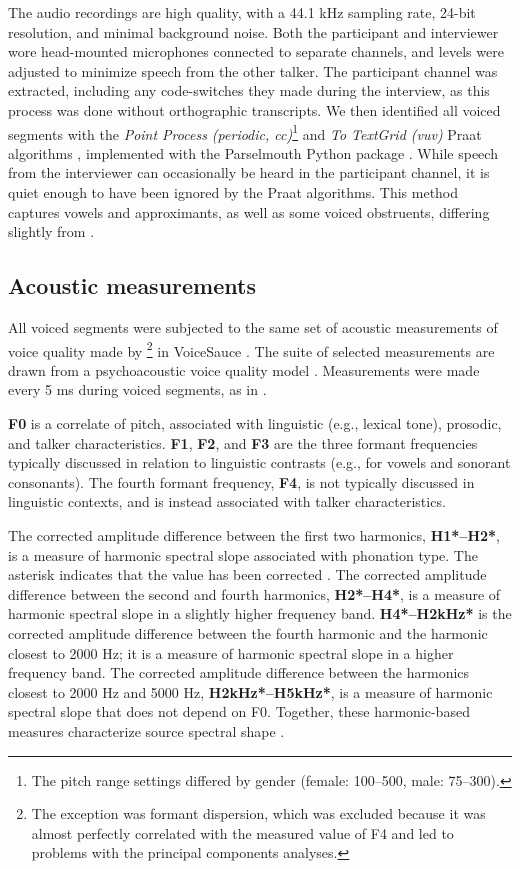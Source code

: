 The audio recordings are high quality, with a 44.1 kHz sampling rate, 24-bit resolution, and minimal background noise. Both the participant and interviewer wore head-mounted microphones connected to separate channels, and levels were adjusted to minimize speech from the other talker. The participant channel was extracted, including any code-switches they made during the interview, as this process was done without orthographic transcripts. We then identified all voiced segments with the \textit{Point Process (periodic, cc)}\footnote{The pitch range settings differed by gender (female: 100--500, male: 75--300).} and \textit{To TextGrid (vuv)} Praat algorithms \citep{boersma_2021_praat}, implemented with the Parselmouth Python package \citep{jadoul_2018_parselmouth}. While speech from the interviewer can occasionally be heard in the participant channel, it is quiet enough to have been ignored by the Praat algorithms. This method captures vowels and approximants, as well as some voiced obstruents, differing slightly from \citep{lee_2019_acoustic-paper}. 

\subsection{Acoustic measurements}\label{ch3:sec:acoustic}
All voiced segments were subjected to the same set of acoustic measurements of voice quality made by \citet{lee_2019_acoustic-paper}\footnote{The exception was formant dispersion, which was excluded because it was almost perfectly correlated with the measured value of F4 and led to problems with the principal components analyses.} in VoiceSauce \citep{shue_2011_voicesauce}. The suite of selected measurements are drawn from a psychoacoustic voice quality model \citep{kreiman_2014_theory}. Measurements were made every 5 ms during voiced segments, as in \citet{lee_2019_acoustic-paper}.

\textbf{F0} is a correlate of pitch, associated with linguistic (e.g., lexical tone), prosodic, and talker characteristics. \textbf{F1}, \textbf{F2}, and \textbf{F3} are the three formant frequencies typically discussed in relation to linguistic contrasts (e.g., for vowels and sonorant consonants). The fourth formant frequency, \textbf{F4}, is not typically discussed in linguistic contexts, and is instead associated with talker characteristics.

The corrected amplitude difference between the first two harmonics, \textbf{H1*--H2*}, is a measure of harmonic spectral slope associated with phonation type. The asterisk indicates that the value has been corrected \citep{iseli_2007_voice}. The corrected amplitude difference between the second and fourth harmonics, \textbf{H2*--H4*}, is a measure of harmonic spectral slope in a slightly higher frequency band. \textbf{H4*--H2kHz*} is the corrected amplitude difference between the fourth harmonic and the harmonic closest to 2000 Hz; it is a measure of harmonic spectral slope in a higher frequency band. The corrected amplitude difference between the harmonics closest to 2000 Hz and 5000 Hz, \textbf{H2kHz*--H5kHz*}, is a measure of harmonic spectral slope that does not depend on F0. Together, these harmonic-based measures characterize source spectral shape \citep{kreiman_2014_theory}. 

